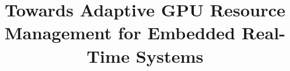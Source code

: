 \documentclass{acm_proc_article-sp}
\begin{document}
\title{
Towards Adaptive GPU Resource Management for Embedded Real-Time Systems
}
%
%
%
%
%
\end{document}
